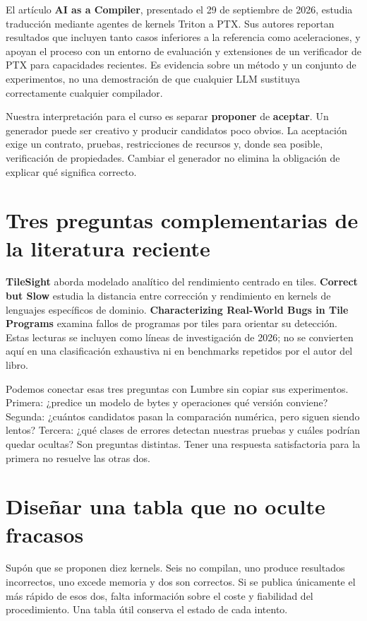 \documentclass[12pt,a4paper,oneside]{report}
\begin{document}
El artículo \textbf{AI as a Compiler}, presentado el 29 de septiembre de 2026, estudia traducción mediante agentes de kernels Triton a PTX. Sus autores reportan resultados que incluyen tanto casos inferiores a la referencia como aceleraciones, y apoyan el proceso con un entorno de evaluación y extensiones de un verificador de PTX para capacidades recientes. Es evidencia sobre un método y un conjunto de experimentos, no una demostración de que cualquier LLM sustituya correctamente cualquier compilador. \cite{taic}

Nuestra interpretación para el curso es separar \textbf{proponer} de \textbf{aceptar}. Un generador puede ser creativo y producir candidatos poco obvios. La aceptación exige un contrato, pruebas, restricciones de recursos y, donde sea posible, verificación de propiedades. Cambiar el generador no elimina la obligación de explicar qué significa correcto.

\section{Tres preguntas complementarias de la literatura reciente}
\textbf{TileSight} aborda modelado analítico del rendimiento centrado en tiles. \textbf{Correct but Slow} estudia la distancia entre corrección y rendimiento en kernels de lenguajes específicos de dominio. \textbf{Characterizing Real-World Bugs in Tile Programs} examina fallos de programas por tiles para orientar su detección. Estas lecturas se incluyen como líneas de investigación de 2026; no se convierten aquí en una clasificación exhaustiva ni en benchmarks repetidos por el autor del libro. \cite{tilesight,correct-slow,tile-bugs}

Podemos conectar esas tres preguntas con Lumbre sin copiar sus experimentos. Primera: ¿predice un modelo de bytes y operaciones qué versión conviene? Segunda: ¿cuántos candidatos pasan la comparación numérica, pero siguen siendo lentos? Tercera: ¿qué clases de errores detectan nuestras pruebas y cuáles podrían quedar ocultas? Son preguntas distintas. Tener una respuesta satisfactoria para la primera no resuelve las otras dos.

\section{Diseñar una tabla que no oculte fracasos}
Supón que se proponen diez kernels. Seis no compilan, uno produce resultados incorrectos, uno excede memoria y dos son correctos. Si se publica únicamente el más rápido de esos dos, falta información sobre el coste y fiabilidad del procedimiento. Una tabla útil conserva el estado de cada intento.
\end{document}
